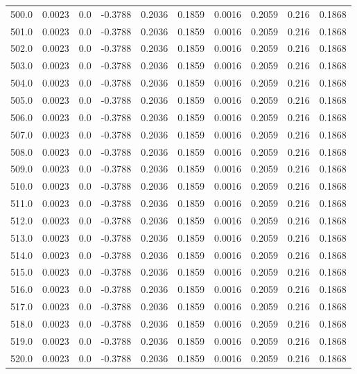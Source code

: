 \begin{longtable}{lrrrrrrrrr}
500.0 & 0.0023 & 0.0 & -0.3788 & 0.2036 & 0.1859 & 0.0016 & 0.2059 & 0.216 & 0.1868 \\
501.0 & 0.0023 & 0.0 & -0.3788 & 0.2036 & 0.1859 & 0.0016 & 0.2059 & 0.216 & 0.1868 \\
502.0 & 0.0023 & 0.0 & -0.3788 & 0.2036 & 0.1859 & 0.0016 & 0.2059 & 0.216 & 0.1868 \\
503.0 & 0.0023 & 0.0 & -0.3788 & 0.2036 & 0.1859 & 0.0016 & 0.2059 & 0.216 & 0.1868 \\
504.0 & 0.0023 & 0.0 & -0.3788 & 0.2036 & 0.1859 & 0.0016 & 0.2059 & 0.216 & 0.1868 \\
505.0 & 0.0023 & 0.0 & -0.3788 & 0.2036 & 0.1859 & 0.0016 & 0.2059 & 0.216 & 0.1868 \\
506.0 & 0.0023 & 0.0 & -0.3788 & 0.2036 & 0.1859 & 0.0016 & 0.2059 & 0.216 & 0.1868 \\
507.0 & 0.0023 & 0.0 & -0.3788 & 0.2036 & 0.1859 & 0.0016 & 0.2059 & 0.216 & 0.1868 \\
508.0 & 0.0023 & 0.0 & -0.3788 & 0.2036 & 0.1859 & 0.0016 & 0.2059 & 0.216 & 0.1868 \\
509.0 & 0.0023 & 0.0 & -0.3788 & 0.2036 & 0.1859 & 0.0016 & 0.2059 & 0.216 & 0.1868 \\
510.0 & 0.0023 & 0.0 & -0.3788 & 0.2036 & 0.1859 & 0.0016 & 0.2059 & 0.216 & 0.1868 \\
511.0 & 0.0023 & 0.0 & -0.3788 & 0.2036 & 0.1859 & 0.0016 & 0.2059 & 0.216 & 0.1868 \\
512.0 & 0.0023 & 0.0 & -0.3788 & 0.2036 & 0.1859 & 0.0016 & 0.2059 & 0.216 & 0.1868 \\
513.0 & 0.0023 & 0.0 & -0.3788 & 0.2036 & 0.1859 & 0.0016 & 0.2059 & 0.216 & 0.1868 \\
514.0 & 0.0023 & 0.0 & -0.3788 & 0.2036 & 0.1859 & 0.0016 & 0.2059 & 0.216 & 0.1868 \\
515.0 & 0.0023 & 0.0 & -0.3788 & 0.2036 & 0.1859 & 0.0016 & 0.2059 & 0.216 & 0.1868 \\
516.0 & 0.0023 & 0.0 & -0.3788 & 0.2036 & 0.1859 & 0.0016 & 0.2059 & 0.216 & 0.1868 \\
517.0 & 0.0023 & 0.0 & -0.3788 & 0.2036 & 0.1859 & 0.0016 & 0.2059 & 0.216 & 0.1868 \\
518.0 & 0.0023 & 0.0 & -0.3788 & 0.2036 & 0.1859 & 0.0016 & 0.2059 & 0.216 & 0.1868 \\
519.0 & 0.0023 & 0.0 & -0.3788 & 0.2036 & 0.1859 & 0.0016 & 0.2059 & 0.216 & 0.1868 \\
520.0 & 0.0023 & 0.0 & -0.3788 & 0.2036 & 0.1859 & 0.0016 & 0.2059 & 0.216 & 0.1868 \\

\end{longtable}
